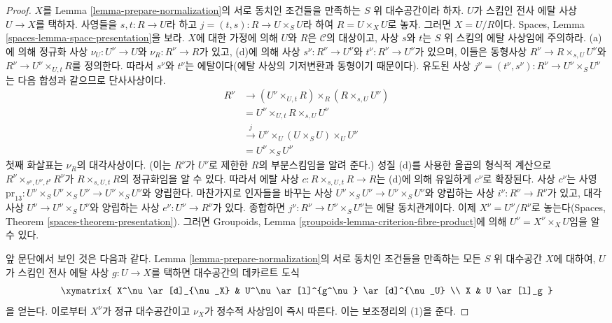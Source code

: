 \begin{proof}
\medskip\noindent
$X$를 Lemma \ref{lemma-prepare-normalization}의 서로 동치인 조건들을
만족하는 $S$ 위 대수공간이라 하자. $U$가 스킴인 전사 에탈 사상
$U \to X$를 택하자. 사영들을 $s, t : R \to U$라 하고
$j = (t, s) : R \to U \times_S U$라 하여 $R = U \times_X U$로 놓자.
그러면 $X = U/R$이다. Spaces, Lemma
\ref{spaces-lemma-space-presentation}을 보라. $X$에 대한 가정에 의해
$U$와 $R$은 $\mathcal{C}$의 대상이고, 사상 $s$와 $t$는 $S$ 위 스킴의
에탈 사상임에 주의하라. (a)에 의해 정규화 사상
$\nu_U : U^\nu \to U$와 $\nu_R : R^\nu \to R$가 있고, (d)에 의해 사상
$s^\nu : R^\nu \to U^\nu$와 $t^\nu : R^\nu \to U^\nu$가 있으며, 이들은
동형사상 $R^\nu \to R \times_{s, U} U^\nu$와
$R^\nu \to U^\nu \times_{U, t} R$를 정의한다. 따라서 $s^\nu$와
$t^\nu$는 에탈이다(에탈 사상의 기저변환과 동형이기 때문이다).
유도된 사상
$j^\nu = (t^\nu, s^\nu) : R^\nu \to U^\nu \times_S U^\nu$는 다음 합성과
같으므로 단사사상이다.
\begin{align*}
R^\nu
& \to
(U^\nu \times_{U, t} R) \times_R (R \times_{s, U} U^\nu) \\
& =
U^\nu \times_{U, t} R \times_{s, U} U^\nu \\
& \xrightarrow{j}
U^\nu \times_U (U \times_S U) \times_U U^\nu \\
& =
U^\nu \times_S U^\nu
\end{align*}
첫째 화살표는 $\nu_R$의 대각사상이다. (이는 $R^\nu$가 $U^\nu$로
제한한 $R$의 부분스킴임을 알려 준다.) 성질 (d)를 사용한 올곱의 형식적
계산으로 $R^\nu \times_{s^\nu, U^\nu, t^\nu} R^\nu$가
$R \times_{s, U, t} R$의 정규화임을 알 수 있다. 따라서 에탈 사상
$c : R \times_{s, U, t} R \to R$는 (d)에 의해 유일하게 $c^\nu$로
확장된다. 사상 $c^\nu$는 사영
$\text{pr}_{13} : U^\nu \times_S U^\nu \times_S U^\nu \to U^\nu \times_S U^\nu$와
양립한다. 마찬가지로 인자들을 바꾸는 사상
$U^\nu \times_S U^\nu \to U^\nu \times_S U^\nu$와 양립하는 사상
$i^\nu : R^\nu \to R^\nu$가 있고, 대각사상
$U^\nu \to U^\nu \times_S U^\nu$와 양립하는 사상
$e^\nu : U^\nu \to R^\nu$가 있다. 종합하면
$j^\nu : R^\nu \to U^\nu \times_S U^\nu$는 에탈 동치관계이다. 이제
$X^\nu = U^\nu/R^\nu$로 놓는다(Spaces, Theorem
\ref{spaces-theorem-presentation}). 그러면 Groupoids, Lemma
\ref{groupoids-lemma-criterion-fibre-product}에 의해
$U^\nu = X^\nu \times_X U$임을 알 수 있다.

\medskip\noindent
앞 문단에서 보인 것은 다음과 같다. Lemma
\ref{lemma-prepare-normalization}의 서로 동치인 조건들을 만족하는 모든
$S$ 위 대수공간 $X$에 대하여, $U$가 스킴인 전사 에탈 사상
$g : U \to X$를 택하면 대수공간의 데카르트 도식
$$
\xymatrix{
X^\nu \ar[d]_{\nu_X} & U^\nu \ar[l]^{g^\nu} \ar[d]^{\nu_U} \\
X & U \ar[l]_g
}
$$
을 얻는다. 이로부터 $X^\nu$가 정규 대수공간이고 $\nu_X$가 정수적
사상임이 즉시 따른다. 이는 보조정리의 (1)을 준다.


\end{proof}
